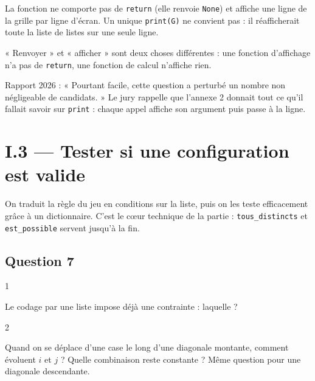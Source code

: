 \documentclass[11pt,a4paper]{article}
\begin{document}
La fonction ne comporte pas de \texttt{return} (elle renvoie \texttt{None}) et affiche une ligne de la grille par ligne d'écran. Un unique \texttt{print(G)} ne convient pas : il réafficherait toute la liste de listes sur une seule ligne.

\begin{methode}

« Renvoyer » et « afficher » sont deux choses différentes : une fonction d'affichage n'a pas de \texttt{return}, une fonction de calcul n'affiche rien.

\end{methode}

\begin{jury}

Rapport 2026 : « Pourtant facile, cette question a perturbé un nombre non négligeable de candidats. » Le jury rappelle que l'annexe 2 donnait tout ce qu'il fallait savoir sur \texttt{print} : chaque appel affiche son argument puis passe à la ligne.

\end{jury}

\hypertarget{i.3-tester-si-une-configuration-est-valide}{%
\section{I.3 --- Tester si une configuration est valide}\label{i.3-tester-si-une-configuration-est-valide}}

On traduit la règle du jeu en conditions sur la liste, puis on les teste efficacement grâce à un dictionnaire. C'est le cœur technique de la partie : \texttt{tous\_distincts} et \texttt{est\_possible} servent jusqu'à la fin.

\hypertarget{question-7}{%
\subsection{Question 7}\label{question-7}}

\begin{indication}{1}

Le codage par une liste impose déjà une contrainte : laquelle ?

\end{indication}

\begin{indication}{2}

Quand on se déplace d'une case le long d'une diagonale montante, comment évoluent \(i\) et \(j\) ? Quelle combinaison reste constante ? Même question pour une diagonale descendante.

\end{indication}
\end{document}
